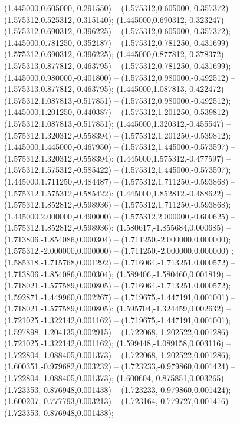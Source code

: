  (1.445000,0.605000,-0.291550) -- (1.575312,0.605000,-0.357372) -- (1.575312,0.525312,-0.315140);
 (1.445000,0.690312,-0.323247) -- (1.575312,0.690312,-0.396225) -- (1.575312,0.605000,-0.357372);
 (1.445000,0.781250,-0.352187) -- (1.575312,0.781250,-0.431699) -- (1.575312,0.690312,-0.396225);
 (1.445000,0.877812,-0.378372) -- (1.575313,0.877812,-0.463795) -- (1.575312,0.781250,-0.431699);
 (1.445000,0.980000,-0.401800) -- (1.575312,0.980000,-0.492512) -- (1.575313,0.877812,-0.463795);
 (1.445000,1.087813,-0.422472) -- (1.575312,1.087813,-0.517851) -- (1.575312,0.980000,-0.492512);
 (1.445000,1.201250,-0.440387) -- (1.575312,1.201250,-0.539812) -- (1.575312,1.087813,-0.517851);
 (1.445000,1.320312,-0.455547) -- (1.575312,1.320312,-0.558394) -- (1.575312,1.201250,-0.539812);
 (1.445000,1.445000,-0.467950) -- (1.575312,1.445000,-0.573597) -- (1.575312,1.320312,-0.558394);
 (1.445000,1.575312,-0.477597) -- (1.575312,1.575312,-0.585422) -- (1.575312,1.445000,-0.573597);
 (1.445000,1.711250,-0.484487) -- (1.575312,1.711250,-0.593868) -- (1.575312,1.575312,-0.585422);
 (1.445000,1.852812,-0.488622) -- (1.575312,1.852812,-0.598936) -- (1.575312,1.711250,-0.593868);
 (1.445000,2.000000,-0.490000) -- (1.575312,2.000000,-0.600625) -- (1.575312,1.852812,-0.598936);
 (1.580617,-1.855684,0.000685) -- (1.713806,-1.854086,0.000304) -- (1.711250,-2.000000,0.000000);
 (1.575312,-2.000000,0.000000) -- (1.711250,-2.000000,0.000000) ;
 (1.585318,-1.715768,0.001292) -- (1.716064,-1.713251,0.000572) -- (1.713806,-1.854086,0.000304);
 (1.589406,-1.580460,0.001819) -- (1.718021,-1.577589,0.000805) -- (1.716064,-1.713251,0.000572);
 (1.592871,-1.449960,0.002267) -- (1.719675,-1.447191,0.001001) -- (1.718021,-1.577589,0.000805);
 (1.595704,-1.324459,0.002632) -- (1.721025,-1.322142,0.001162) -- (1.719675,-1.447191,0.001001);
 (1.597898,-1.204135,0.002915) -- (1.722068,-1.202522,0.001286) -- (1.721025,-1.322142,0.001162);
 (1.599448,-1.089158,0.003116) -- (1.722804,-1.088405,0.001373) -- (1.722068,-1.202522,0.001286);
 (1.600351,-0.979682,0.003232) -- (1.723233,-0.979860,0.001424) -- (1.722804,-1.088405,0.001373);
 (1.600604,-0.875851,0.003265) -- (1.723353,-0.876948,0.001438) -- (1.723233,-0.979860,0.001424);
 (1.600207,-0.777793,0.003213) -- (1.723164,-0.779727,0.001416) -- (1.723353,-0.876948,0.001438);
